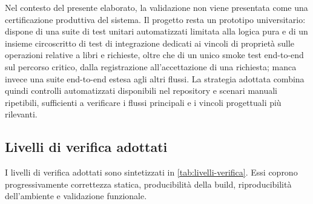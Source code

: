 Nel contesto del presente elaborato, la validazione non viene presentata come una certificazione produttiva del sistema. Il progetto resta un prototipo universitario: dispone di una suite di test unitari automatizzati limitata alla logica pura e di un insieme circoscritto di test di integrazione dedicati ai vincoli di proprietà sulle operazioni relative a libri e richieste, oltre che di un unico smoke test end-to-end sul percorso critico, dalla registrazione all'accettazione di una richiesta; manca invece una suite end-to-end estesa agli altri flussi. La strategia adottata combina quindi controlli automatizzati disponibili nel repository e scenari manuali ripetibili, sufficienti a verificare i flussi principali e i vincoli progettuali più rilevanti.


\subsection{Livelli di verifica adottati}
\label{subsec:livelli-testing}

I livelli di verifica adottati sono sintetizzati in \cref{tab:livelli-verifica}. Essi coprono progressivamente correttezza statica, producibilità della build, riproducibilità dell'ambiente e validazione funzionale.

